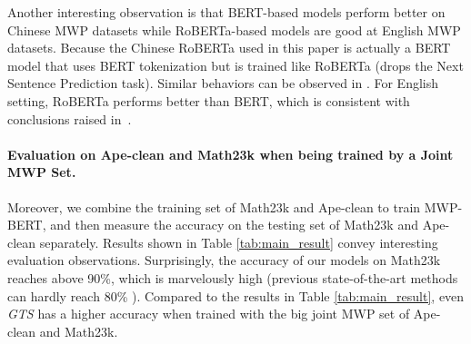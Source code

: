 \documentclass[11pt]{article}
\begin{document}
Another interesting observation is that BERT-based models perform better on Chinese MWP datasets while RoBERTa-based models are good at English MWP datasets. Because the Chinese RoBERTa used in this paper is actually a BERT model that uses BERT tokenization but is trained like RoBERTa (drops the Next Sentence Prediction task). Similar behaviors can be observed in \citet{cui2020revisiting}. For English setting, RoBERTa performs better than BERT, which is consistent with conclusions raised in~\citet{liu2019roberta}.





\begin{table}[t]
\renewcommand\arraystretch{1.2}
\centering
{}
\caption{Comparison of answer accuracy (\%) between our proposed models and baselines when they are all trained by the combination of the training set from Ape-clean and Math23k dataset.}

\label{tab:result_ape}
\end{table}

 

\paragraph{Evaluation on Ape-clean and Math23k  when being trained by a Joint MWP Set.}

Moreover, we combine the training set of Math23k and Ape-clean to train MWP-BERT, and then measure the accuracy on the testing set of Math23k and Ape-clean separately. Results shown in Table \ref{tab:main_result} convey interesting evaluation observations. Surprisingly, 
the accuracy of our models on Math23k reaches above 90\%, which is marvelously high (previous state-of-the-art methods can hardly reach 80\% \cite{shen2020solving}). 
Compared to the results in Table \ref{tab:main_result}, even \textsl{GTS} has a higher accuracy when trained  with the big joint MWP set of Ape-clean and Math23k. 
\end{document}
